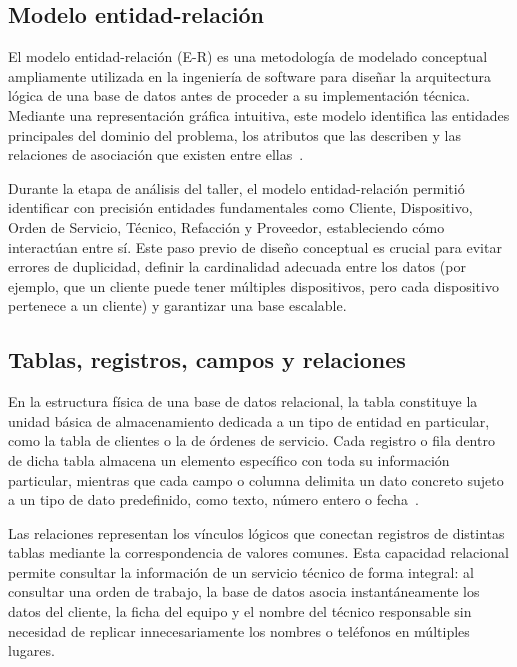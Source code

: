 \subsection{Modelo entidad-relación}

El modelo entidad-relación (E-R) es una metodología de modelado conceptual ampliamente utilizada en la ingeniería de software para diseñar la arquitectura lógica de una base de datos antes de proceder a su implementación técnica. Mediante una representación gráfica intuitiva, este modelo identifica las entidades principales del dominio del problema, los atributos que las describen y las relaciones de asociación que existen entre ellas~\cite{elmasri2016fundamentals}.

Durante la etapa de análisis del taller, el modelo entidad-relación permitió identificar con precisión entidades fundamentales como Cliente, Dispositivo, Orden de Servicio, Técnico, Refacción y Proveedor, estableciendo cómo interactúan entre sí. Este paso previo de diseño conceptual es crucial para evitar errores de duplicidad, definir la cardinalidad adecuada entre los datos (por ejemplo, que un cliente puede tener múltiples dispositivos, pero cada dispositivo pertenece a un cliente) y garantizar una base escalable.

\subsection{Tablas, registros, campos y relaciones}

En la estructura física de una base de datos relacional, la tabla constituye la unidad básica de almacenamiento dedicada a un tipo de entidad en particular, como la tabla de clientes o la de órdenes de servicio. Cada registro o fila dentro de dicha tabla almacena un elemento específico con toda su información particular, mientras que cada campo o columna delimita un dato concreto sujeto a un tipo de dato predefinido, como texto, número entero o fecha~\cite{elmasri2016fundamentals}.

Las relaciones representan los vínculos lógicos que conectan registros de distintas tablas mediante la correspondencia de valores comunes. Esta capacidad relacional permite consultar la información de un servicio técnico de forma integral: al consultar una orden de trabajo, la base de datos asocia instantáneamente los datos del cliente, la ficha del equipo y el nombre del técnico responsable sin necesidad de replicar innecesariamente los nombres o teléfonos en múltiples lugares.

